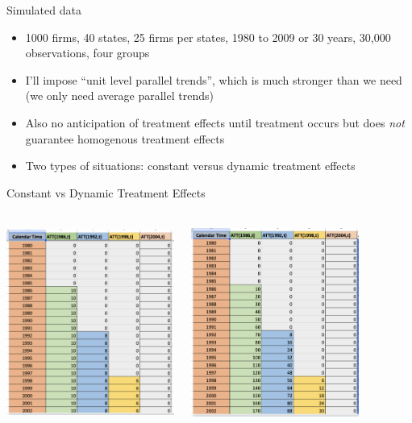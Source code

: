 \documentclass{beamer}
\begin{document}
\begin{frame}{Simulated data}

\begin{itemize}
\item 1000 firms, 40 states, 25 firms per states, 1980 to 2009 or 30 years, 30,000 observations, four groups

\item I'll impose ``unit level parallel trends'', which is much stronger than we need (we only need average parallel trends)

\item Also no anticipation of treatment effects until treatment occurs but does \emph{not} guarantee homogenous treatment effects

\item Two types of situations: constant versus dynamic treatment effects
\end{itemize}
\end{frame}



\begin{frame}{Constant vs Dynamic Treatment Effects}
    \begin{columns}
        \centering
        \includegraphics[height=6.5cm, width=5.5cm]{./lecture_includes/constant_te}

        \centering
        \includegraphics[height=6.5cm, width=5.5cm]{./lecture_includes/dynamic_te}
    \end{columns} 
\end{frame}
\end{document}
